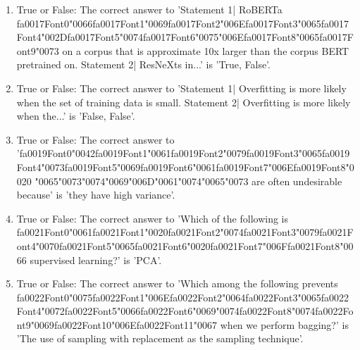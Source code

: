\documentclass[12pt]{article}
\begin{document}
\begin{enumerate}[label=\arabic*.]
\item True or False: The correct answer to 'Statement 1| RoBERTa {\csname fa0017Font0\endcsname\char"0066}{\csname fa0017Font1\endcsname\char"0069}{\csname fa0017Font2\endcsname\char"006E}{\csname fa0017Font3\endcsname\char"0065}{\csname fa0017Font4\endcsname\char"002D}{\csname fa0017Font5\endcsname\char"0074}{\csname fa0017Font6\endcsname\char"0075}{\char"006E}{\csname fa0017Font8\endcsname\char"0065}{\csname fa0017Font9\endcsname\char"0073} on a corpus that is approximate 10x larger than the corpus BERT pretrained on. Statement 2| ResNeXts in...' is 'True, False'.
\item True or False: The correct answer to 'Statement 1| Overfitting is more likely when the set of training data is small. Statement 2| Overfitting is more likely when the...' is 'False, False'.
\item True or False: The correct answer to '{\csname fa0019Font0\endcsname\char"0042}{\csname fa0019Font1\endcsname\char"0061}{\csname fa0019Font2\endcsname\char"0079}{\csname fa0019Font3\endcsname\char"0065}{\csname fa0019Font4\endcsname\char"0073}{\csname fa0019Font5\endcsname\char"0069}{\csname fa0019Font6\endcsname\char"0061}{\csname fa0019Font7\endcsname\char"006E}{\csname fa0019Font8\endcsname\char"0020} {\char"0065}{\char"0073}{\char"0074}{\char"0069}{\char"006D}{\char"0061}{\char"0074}{\char"0065}{\char"0073} are often undesirable because' is 'they have high variance'.
\item True or False: The correct answer to 'Which of the following is {\csname fa0021Font0\endcsname\char"0061}{\csname fa0021Font1\endcsname\char"0020}{\csname fa0021Font2\endcsname\char"0074}{\csname fa0021Font3\endcsname\char"0079}{\csname fa0021Font4\endcsname\char"0070}{\csname fa0021Font5\endcsname\char"0065}{\csname fa0021Font6\endcsname\char"0020}{\csname fa0021Font7\endcsname\char"006F}{\csname fa0021Font8\endcsname\char"0066} supervised learning?' is 'PCA'.
\item True or False: The correct answer to 'Which among the following prevents {\csname fa0022Font0\endcsname\char"0075}{\csname fa0022Font1\endcsname\char"006E}{\csname fa0022Font2\endcsname\char"0064}{\csname fa0022Font3\endcsname\char"0065}{\csname fa0022Font4\endcsname\char"0072}{\csname fa0022Font5\endcsname\char"0066}{\csname fa0022Font6\endcsname\char"0069}{\char"0074}{\csname fa0022Font8\endcsname\char"0074}{\csname fa0022Font9\endcsname\char"0069}{\csname fa0022Font10\endcsname\char"006E}{\csname fa0022Font11\endcsname\char"0067} when we perform bagging?' is 'The use of sampling with replacement as the sampling technique'.

\end{enumerate}
\end{document}
